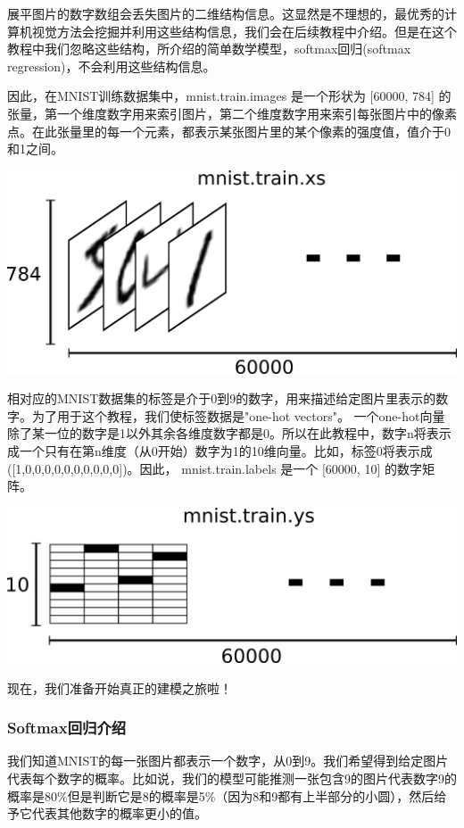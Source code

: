 \documentclass[a4paper,11pt,twoside]{ctexart}
\begin{document}
展平图片的数字数组会丢失图片的二维结构信息。这显然是不理想的，最优秀的计算机视觉方法会挖掘并利用这些结构信息，我们会在后续教程中介绍。但是在这个教程中我们忽略这些结构，所介绍的简单数学模型，softmax回归(softmax regression)，不会利用这些结构信息。

因此，在MNIST训练数据集中，mnist.train.images 是一个形状为 [60000, 784] 的张量，第一个维度数字用来索引图片，第二个维度数字用来索引每张图片中的像素点。在此张量里的每一个元素，都表示某张图片里的某个像素的强度值，值介于0和1之间。

\includegraphics[width=.75\textwidth]{../SOURCE/images/mnist-train-xs.png}

相对应的MNIST数据集的标签是介于0到9的数字，用来描述给定图片里表示的数字。为了用于这个教程，我们使标签数据是"one-hot vectors"。 一个one-hot向量除了某一位的数字是1以外其余各维度数字都是0。所以在此教程中，数字n将表示成一个只有在第n维度（从0开始）数字为1的10维向量。比如，标签0将表示成([1,0,0,0,0,0,0,0,0,0,0])。因此， mnist.train.labels 是一个 [60000, 10] 的数字矩阵。

\includegraphics[width=.75\textwidth]{../SOURCE/images/mnist-train-ys.png}

现在，我们准备开始真正的建模之旅啦！

\subsubsection {Softmax回归介绍}

我们知道MNIST的每一张图片都表示一个数字，从0到9。我们希望得到给定图片代表每个数字的概率。比如说，我们的模型可能推测一张包含9的图片代表数字9的概率是80\%但是判断它是8的概率是5\%（因为8和9都有上半部分的小圆），然后给予它代表其他数字的概率更小的值。
\end{document}
